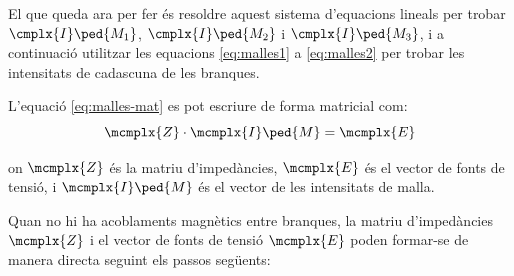 El que queda ara per fer és resoldre aquest sistema d'equacions lineals per trobar $\cmplx{I}\ped{M_1}$, $\cmplx{I}\ped{M_2}$ i $\cmplx{I}\ped{M_3}$, i a continuació utilitzar les equacions \eqref{eq:malles1} a \eqref{eq:malles2} per trobar les intensitats de cadascuna de les branques.

L'equació \eqref{eq:malles-mat} es pot escriure de forma matricial com:
\begin{equation}
  \mcmplx{Z} \cdot\mcmplx{I}\ped{M} = \mcmplx{E}
\end{equation}

on  $\mcmplx{Z}$ és la matriu d'impedàncies, $\mcmplx{E}$ és el vector de fonts de tensió, i $\mcmplx{I}\ped{M}$ és el vector de les intensitats de malla.

 Quan no hi ha acoblaments magnètics entre branques, la matriu d'impedàncies $\mcmplx{Z}$ i el vector de fonts de tensió $\mcmplx{E}$ poden formar-se de manera directa seguint els passos següents:
